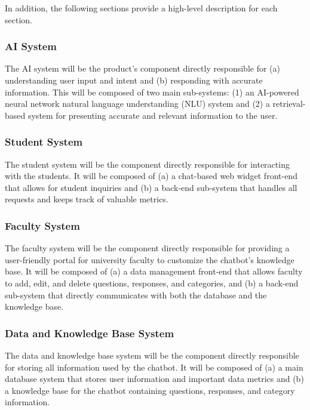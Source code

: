\documentclass[titlepage, 12pt]{article}
\begin{document}
In addition, the following sections provide a high-level description for each section.

\subsubsection{AI System}

The AI system will be the product’s component directly responsible for (a) understanding user input and intent and (b) responding with accurate information. This will be composed of two main sub-systems: (1) an AI-powered neural network natural language understanding (NLU) system and (2) a retrieval-based system for presenting accurate and relevant information to the user.

\subsubsection{Student System}

The student system will be the component directly responsible for interacting with the students. It will be composed of (a) a chat-based web widget front-end that allows for student inquiries and (b) a back-end sub-system that handles all requests and keeps track of valuable metrics.

\subsubsection{Faculty System}

The faculty system will be the component directly responsible for providing a user-friendly portal for university faculty to customize the chatbot’s knowledge base. It will be composed of (a) a data management front-end that allows faculty to add, edit, and delete questions, responses, and categories, and (b) a back-end sub-system that directly communicates with both the database and the knowledge base.

\subsubsection{Data and Knowledge Base System}

The data and knowledge base system will be the component directly responsible for storing all information used by the chatbot. It will be composed of (a) a main database system that stores user information and important data metrics and (b) a knowledge base for the chatbot containing questions, responses, and category information.
\end{document}
